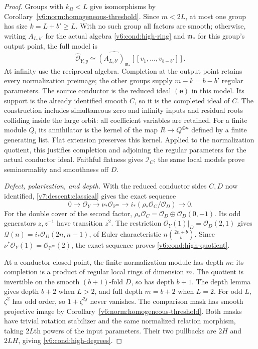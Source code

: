 \documentclass[10pt,fleqn]{article}
\numberwithin{equation}{section}
\newcommand{\PP}{\mathbb P}
\begin{document}
\begin{proof}
Groups with $k_\Omega<L$ give isomorphisms by
Corollary~\ref{v6:norm:homogeneous-threshold}.  Since $m<2L$, at most one
group has size $k=L+b'\ge L$.  With no such group all factors are smooth;
otherwise,
writing $A_{L,b'}$ for the actual algebra
\eqref{v6:cond:high-ring} and $\mathfrak m_*$ for this group's
output point, the full model is
\[
 \widehat{\mathcal O}_{Y,y}\simeq
 \widehat{(A_{L,b'})_{\mathfrak m_*}}
 [[v_1,\ldots,v_{b-b'}]].
\]
At infinity use the reciprocal algebra.  Completion at the output point
retains every normalization preimage; the other groups supply
$m-k=b-b'$ regular parameters.  The source conductor is the reduced ideal
$(\mathbf e)$ in this model.  Its support is the already identified
smooth $C$, so it is the completed ideal of $C$.
The construction includes simultaneous zero and infinity inputs and
residual roots colliding inside the large orbit: all coefficient
variables are retained.
For a finite module $Q$, its annihilator is the kernel of the map
$R\to Q^{\oplus n}$ defined by a finite generating list.  Flat extension
preserves this kernel.  Applied to the normalization quotient, this
justifies completion and adjoining the regular parameters for the
actual conductor ideal.  Faithful flatness gives $\mathcal I_C$;
the same local models prove seminormality and smoothness off $D$.

\emph{Defect, polarization, and depth.}
With the reduced conductor sides $C,D$ now identified,
\eqref{v7:descent:classical} gives the exact sequence
\cite[Lemma 1.3]{Ferrand}
\[
 0\longrightarrow\mathcal O_Y\longrightarrow\nu_*\mathcal O_{\PP^m}
 \longrightarrow i_*(\rho_*\mathcal O_C/\mathcal O_D)
 \longrightarrow0.
\]
For the double cover of the second factor,
$\rho_*\mathcal O_C=\mathcal O_D\oplus\mathcal O_D(0,-1)$.
Its odd generators $z,z^{-1}$ have transition $z^2$.
The restriction $\mathcal O_Y(1)|_D=\mathcal O_D(2,1)$ gives
$\mathcal Q(n)=i_*\mathcal O_D(2n,n-1)$, of Euler characteristic
$n\binom{2n+b}{b}$.  Since $\nu^*\mathcal O_Y(1)=\mathcal O_{\PP^m}(2)$,
the exact sequence proves \eqref{v6:cond:high-quotient}.

At a conductor closed point, the finite normalization module has depth
$m$: its completion is a product of regular local rings of dimension
$m$.  The quotient is invertible on the smooth $(b+1)$-fold $D$, so
has depth $b+1$.  The depth lemma \cite[Tag 00LX]{Stacks} gives depth
$b+2$ when $L>2$, and full depth $m=b+2$ when $L=2$.
For odd $L$, $\zeta^2$ has odd order, so $1+\zeta^{2j}$ never vanishes.
The comparison mask has smooth projective image by
Corollary~\ref{v6:norm:homogeneous-threshold}.  Both masks have trivial
rotation stabilizer and the same normalized relation morphism, taking
$2L$th powers of the input parameters.  Their two pullbacks are
$2H$ and $2LH$, giving \eqref{v6:cond:high-degrees}.
\end{proof}
\end{document}
